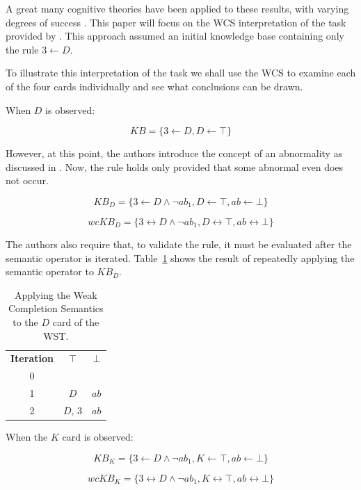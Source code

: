 \documentclass[
11pt, %
english, %
singlespacing, %
headsepline, %
]{MastersDoctoralThesis} %
\begin{document}
A great many cognitive theories have been applied to these results, with varying degrees of success \cite{ragni2017formal}. This paper will focus on the WCS interpretation of the task provided by \citep{ragni2017wason}. This approach assumed an initial knowledge base containing only the rule $3 \leftarrow D$.

To illustrate this interpretation of the task we shall use the WCS to examine each of the four cards individually and see what conclusions can be drawn.

When $D$ is observed:

\[
KB = \{3 \leftarrow D, D\leftarrow \top \}
\]

However, at this point, the authors introduce the concept of an abnormality as discussed in \citep{ragni2017formal}. Now, the rule holds only provided that some abnormal even does not occur.

\[
KB_D = \{3 \leftarrow D \land \lnot ab_1, D \leftarrow \top, ab \leftarrow \bot \}
\]

\[
wcKB_D = \{3 \leftrightarrow D \land \lnot ab_1, D \leftrightarrow \top, ab \leftrightarrow \bot \}
\]

The authors also require that, to validate the rule, it must be evaluated after the semantic operator is iterated. Table~\ref{tbl:dcard} shows the result of repeatedly applying the semantic operator to $KB_D$. 

\begin{table}
\begin{center}

\begin{tabular}{ c c c }
 \textbf{Iteration} & \textbf{$\top$} & \textbf{$\bot$} \\ 
 0 &  &  \\  
 1 &  $D$ & $ab$  \\  
 2 &  $D$, $3$ & $ab$  
\end{tabular}
\caption{Applying the Weak Completion Semantics to the $D$ card of the WST.}
\label{tbl:dcard}

\end{center}
\end{table}

When the $K$ card is observed:

\[
KB_K = \{3 \leftarrow D \land \lnot ab_1, K \leftarrow \top, ab \leftarrow \bot \}
\]

\[
wcKB_K = \{3 \leftrightarrow D \land \lnot ab_1, K \leftrightarrow \top, ab \leftrightarrow \bot \}
\]
\end{document}
